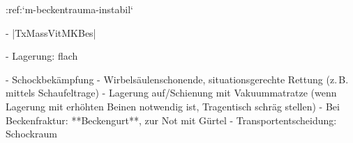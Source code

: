 :ref:`m-beckentrauma-instabil`
\begin{itemize}
  -   |TxMassVitMKBes|
  \begin{itemize}
    -   Lagerung: flach
  \end{itemize}
  -   Schockbekämpfung
  -   Wirbelsäulenschonende, situationsgerechte Rettung (z.\,B. mittels
  Schaufeltrage)
  -   Lagerung auf/Schienung mit Vakuummatratze (wenn
  Lagerung mit erhöhten Beinen notwendig ist,
  Tragentisch schräg stellen)
  -   Bei Beckenfraktur:
  **Beckengurt**, zur Not mit
  Gürtel
  -   Transportentscheidung: Schockraum
\end{itemize}